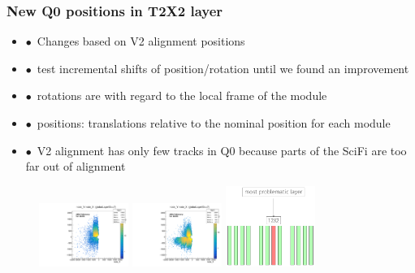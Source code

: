 \documentclass[aspectratio=1610, 12pt]{beamer}
\begin{document}
\begin{frame}\frametitle{New Q0 positions in T2X2 layer}
  \begin{itemize}
    \item $\bullet$\, Changes based on V2 alignment positions
    \item $\bullet$\, test incremental shifts of position/rotation until we found an improvement
    \item $\bullet$\, rotations are with regard to the local frame of the module
    \item $\bullet$\, positions: translations relative to the nominal position for each module
    \item $\bullet$\, V2 alignment has only few tracks in Q0 because parts of the SciFi are too far out of alignment
  \end{itemize}
  \begin{figure}
    \includegraphics[width=0.26\textwidth]{logos/2D_nodeXY_v2_7_left.pdf}%
    \includegraphics[width=0.26\textwidth]{logos/2D_nodeXY_quartermean_7_left.pdf}%
    \includegraphics[width=0.26\textwidth]{logos/bad_layer.png}%
  \end{figure}
\end{frame}
\end{document}

